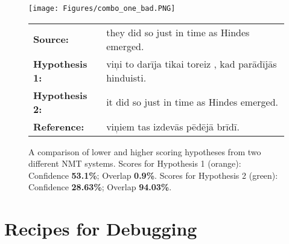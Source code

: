 \documentclass[runningheads,a4paper]{lncs/llncs}
\begin{document}
\begin{figure*}[ht]
  \texttt{[image: Figures/combo\_one\_bad.PNG]}
  \begin{tabular}{lp{10.4cm}}
   \bf Source: & they did so just in time as Hindes emerged. \\
   \bf Hypothesis 1: & viņi to darīja tikai toreiz , kad parādījās hinduisti. \\
   \bf Hypothesis 2: & it did so just in time as Hindes emerged. \\
   \bf Reference: & viņiem tas izdevās pēdējā brīdī. \\
  \end{tabular}
  \caption{A comparison of lower and higher scoring hypotheses from two different NMT systems. 
  Scores for Hypothesis 1 (orange): Confidence \textbf{53.1\%}; Overlap \textbf{0.9\%}. Scores for Hypothesis 2 (green): Confidence \textbf{28.63\%}; Overlap \textbf{94.03\%}. }
  \label{fig:nmt-comparison-2}
\end{figure*}


\section{Recipes for Debugging}
\label{sec:debugging}
\end{document}

